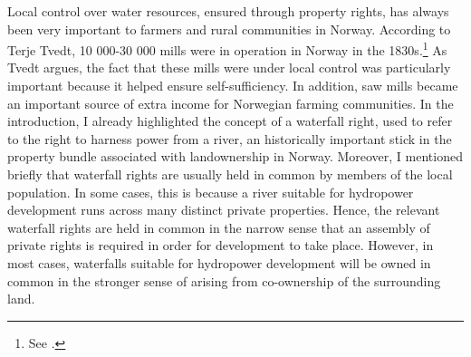 Local control over water resources, ensured through property rights, has always been very important to farmers and rural communities in Norway. According to Terje Tvedt, 10 000-30 000 mills were in operation in Norway in the 1830s.\footnote{See \cite[121]{tvedt13}.} As Tvedt argues, the fact that these mills were under local control was particularly important because it helped ensure self-sufficiency. In addition, saw mills became an important source of extra income for Norwegian farming communities. In the introduction, I already highlighted the concept of a waterfall right, used to refer to the right to harness power from a river, an historically important stick in the property bundle associated with landownership in Norway. Moreover, I mentioned briefly that waterfall rights are usually held in common by members of the local population. In some cases, this is because a river suitable for hydropower development runs across many distinct private properties. Hence, the relevant waterfall rights are held in common in the narrow sense that an assembly of private rights is required in order for development to take place. However, in most cases, waterfalls suitable for hydropower development will be owned in common in the stronger sense of arising from co-ownership of the surrounding land. %

